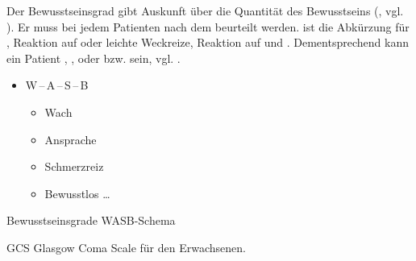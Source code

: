 {%
\label{topic:bewusstseinsstoerung-grade}
\label{topic:bewusstseinsgrad}
%
Der Bewusstseinsgrad gibt Auskunft über die Quantität des
Bewusstseins (, vgl.
). 
Er muss bei jedem Patienten nach dem
 beurteilt
werden. 
%
 ist die Abkürzung für 
,
Reaktion auf  oder
  leichte Weckreize,
Reaktion auf  und
. 
%
Dementsprechend kann ein Patient
, , 
oder   bzw.  sein, vgl.
.
}{
\begin{itemize}
  \item W\,--\,A\,--\,S\,--\,B
  \begin{itemize}
    \item Wach \dotfill  {}
    \item Ansprache \dotfill 
    \item Schmerzreiz \dotfill  {}
    \item Bewusstlos \ldots  {}
  \end{itemize}
\end{itemize}
}{}{}{}

\TableWide
{Bewusstseinsgrade}%
{WASB-Schema}%
{\label{tab:bewusstseinsgrade}}%
{}%
{}%
{{\protect}}%



%
%

\Table
{GCS}%
{Glasgow Coma Scale für den Erwachsenen.}%
{\label{tab:gcs}}%
{}%
{}%
{{\protect}}%
{}%








